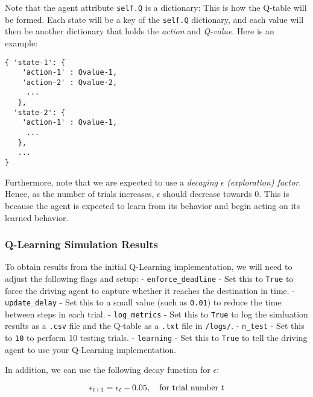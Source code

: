 \documentclass[11pt]{article}
\begin{document}
Note that the agent attribute \texttt{self.Q} is a dictionary: This is
how the Q-table will be formed. Each state will be a key of the
\texttt{self.Q} dictionary, and each value will then be another
dictionary that holds the \emph{action} and \emph{Q-value}. Here is an
example:

\begin{verbatim}
{ 'state-1': { 
    'action-1' : Qvalue-1,
    'action-2' : Qvalue-2,
     ...
   },
  'state-2': {
    'action-1' : Qvalue-1,
     ...
   },
   ...
}
\end{verbatim}

Furthermore, note that we are expected to use a \emph{decaying}
\(\epsilon\) \emph{(exploration) factor}. Hence, as the number of trials
increases, \(\epsilon\) should decrease towards 0. This is because the
agent is expected to learn from its behavior and begin acting on its
learned behavior.

    \hypertarget{q-learning-simulation-results}{%
\subsubsection{Q-Learning Simulation
Results}\label{q-learning-simulation-results}}

To obtain results from the initial Q-Learning implementation, we will
need to adjust the following flags and setup: -
\texttt{\textquotesingle{}enforce\_deadline\textquotesingle{}} - Set
this to \texttt{True} to force the driving agent to capture whether it
reaches the destination in time. -
\texttt{\textquotesingle{}update\_delay\textquotesingle{}} - Set this to
a small value (such as \texttt{0.01}) to reduce the time between steps
in each trial. -
\texttt{\textquotesingle{}log\_metrics\textquotesingle{}} - Set this to
\texttt{True} to log the simluation results as a \texttt{.csv} file and
the Q-table as a \texttt{.txt} file in \texttt{/logs/}. -
\texttt{\textquotesingle{}n\_test\textquotesingle{}} - Set this to
\texttt{\textquotesingle{}10\textquotesingle{}} to perform 10 testing
trials. - \texttt{\textquotesingle{}learning\textquotesingle{}} - Set
this to \texttt{\textquotesingle{}True\textquotesingle{}} to tell the
driving agent to use your Q-Learning implementation.

In addition, we can use the following decay function for \(\epsilon\):

\[ \epsilon_{t+1} = \epsilon_{t} - 0.05, \hspace{10px}\textrm{for trial number } t\]
\end{document}
